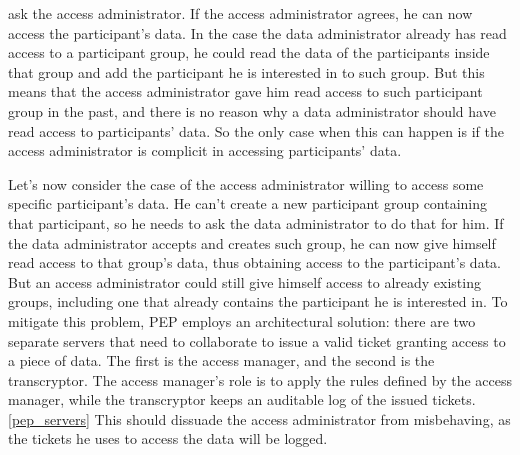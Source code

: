 \documentclass{report}
\begin{document}
ask the access administrator. If the access administrator agrees, he can now access the participant's data. In the case the data administrator already has read access to a participant 
group, he could read the data of the participants inside that group and add the participant he is interested in to such group. But this means that the access administrator gave him 
read access to such participant group in the past, and there is no reason why a data administrator should have read access to participants' data. So the only case when this can happen 
is if the access administrator is complicit in accessing participants' data. \par
Let's now consider the case of the access administrator willing to access some specific participant's data. 
He can't create a new participant group containing that participant, so he needs to ask the data administrator to do that for him. If the data administrator accepts and creates such 
group, he can now give himself read access to that group's data, thus obtaining access to the participant's data. But an access administrator could still give himself access to already 
existing groups, including one that already contains the participant he is interested in. To mitigate this problem, PEP employs an architectural solution: there are two separate
servers that need to collaborate to issue a valid ticket granting access to a piece of data. The first is the access manager, and the second is the transcryptor. The access manager's 
role is to apply the rules defined by the access manager, while the transcryptor keeps an auditable log of the issued tickets.\ref{pep_servers} This should dissuade the access 
administrator from misbehaving, as the tickets he uses to access the data will be logged.
\end{document}
